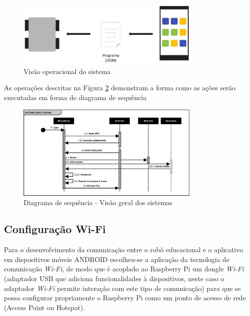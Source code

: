 \begin{figure}[H]
    \centering
    \includegraphics[width=0.8\textwidth]{figuras/overview.eps}
    \caption{Visão operacional do sistema}
    \label{fig:overview}
\end{figure}

As operações descritas na Figura \ref{fig:sequencia} demonstram a forma como as ações serão executadas em forma de diagrama de sequência

\begin{figure}[H]
    \centering
    \includegraphics[width=0.8\textwidth]{figuras/diagrama_de_sequencia.eps}
    \caption{Diagrama de sequência - Visão geral dos sistemas}
    \label{fig:sequencia}
\end{figure}

\subsection{Configuração Wi-Fi}

Para o desenvolvimento da comunicação entre o robô educacional e o aplicativo em dispositivos móveis ANDROID escolheu-se a aplicação da
tecnologia de comunicação \textit{Wi-Fi}, de modo que é acoplado ao Raspberry Pi um dongle \textit{Wi-Fi} (adaptador USB que adiciona funcionalidades à
dispositivos, neste caso o adaptador \textit{Wi-Fi} permite interação com este tipo de comunicação) para que se possa configurar propriamente o
Raspberry Pi como um ponto de acesso de rede (Access Point ou Hotspot).

